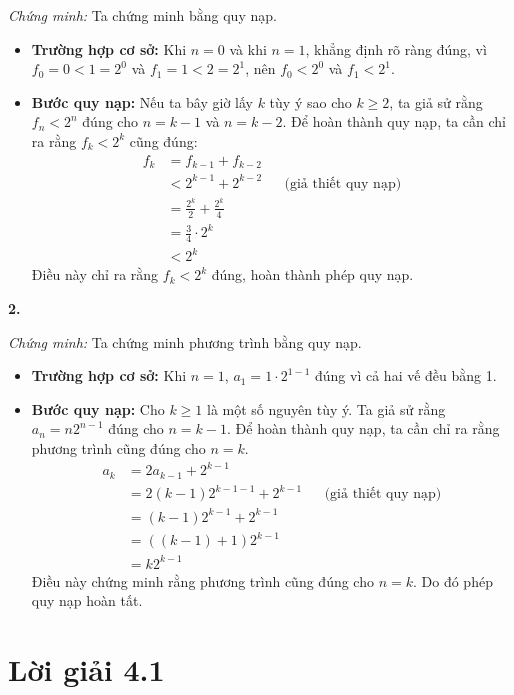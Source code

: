 \documentclass[12pt,a4paper]{article}
\theoremstyle{definition}
\begin{document}
\textit{Chứng minh:} Ta chứng minh bằng quy nạp.
\begin{itemize}
\item \textbf{Trường hợp cơ sở:} Khi $n = 0$ và khi $n = 1$, khẳng định rõ ràng đúng, vì $f_0 = 0 < 1 = 2^0$ và $f_1 = 1 < 2 = 2^1$, nên $f_0 < 2^0$ và $f_1 < 2^1$.
\item \textbf{Bước quy nạp:} Nếu ta bây giờ lấy $k$ tùy ý sao cho $k \ge 2$, ta giả sử rằng $f_n < 2^n$ đúng cho $n = k - 1$ và $n = k - 2$. Để hoàn thành quy nạp, ta cần chỉ ra rằng $f_k < 2^k$ cũng đúng:
\begin{align*}
f_k &= f_{k-1} + f_{k-2} \\
&< 2^{k-1} + 2^{k-2} && \text{(giả thiết quy nạp)}\\
&= \frac{2^k}{2} + \frac{2^k}{4} \\
&= \frac{3}{4} \cdot 2^k \\
&< 2^k
\end{align*}
Điều này chỉ ra rằng $f_k < 2^k$ đúng, hoàn thành phép quy nạp.
\end{itemize}

\bigskip
\textbf{2.}

\textit{Chứng minh:} Ta chứng minh phương trình bằng quy nạp.
\begin{itemize}
\item \textbf{Trường hợp cơ sở:} Khi $n = 1$, $a_1 = 1 \cdot 2^{1-1}$ đúng vì cả hai vế đều bằng 1.
\item \textbf{Bước quy nạp:} Cho $k \ge 1$ là một số nguyên tùy ý. Ta giả sử rằng $a_n = n2^{n-1}$ đúng cho $n = k - 1$. Để hoàn thành quy nạp, ta cần chỉ ra rằng phương trình cũng đúng cho $n = k$.
\begin{align*}
a_k &= 2a_{k-1} + 2^{k-1} \\
&= 2(k - 1)2^{k-1-1} + 2^{k-1} && \text{(giả thiết quy nạp)}\\
&= (k - 1)2^{k-1} + 2^{k-1} \\
&= ((k - 1) + 1)2^{k-1} \\
&= k2^{k-1}
\end{align*}
Điều này chứng minh rằng phương trình cũng đúng cho $n = k$. Do đó phép quy nạp hoàn tất.
\end{itemize}

\section*{Lời giải 4.1}
\end{document}
